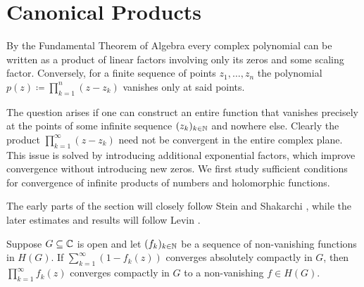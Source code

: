 \section{Canonical Products} \label{sec:canonical-products}

By the Fundamental Theorem of Algebra every complex polynomial can be written as a product of linear factors involving only its zeros and some scaling factor. Conversely, for a finite sequence of points $z_1, \hdots, z_n$ the polynomial $p(z) \coloneqq \prod_{k=1}^n (z - z_k)$ vanishes only at said points.

The question arises if one can construct an entire function that vanishes precisely at the points of some infinite sequence $(z_k)_{k \in \mathbb{N}}$ and nowhere else. Clearly the product $\prod_{k=1}^\infty (z - z_k)$ need not be convergent in the entire complex plane. This issue is solved by introducing additional exponential factors, which improve convergence without introducing new zeros. We first study sufficient conditions for convergence of infinite products of numbers and holomorphic functions.

The early parts of the section will closely follow Stein and Shakarchi \cite{stein-shakarchi-princeton}, while the later estimates and results will follow Levin \cite{levin-distribution-of-zeros}.

\begin{lemma} \label{lem:infinite-product-criteria}
    Suppose $G \subseteq \mathbb{C}$ is open and let $(f_k)_{k \in \mathbb{N}}$ be a sequence of non-vanishing functions in $H(G)$. If $\sum_{k=1}^\infty (1 - f_k(z))$ converges absolutely compactly in $G$, then $\prod_{k=1}^\infty f_k(z)$ converges compactly in $G$ to a non-vanishing $f \in H(G)$.
\end{lemma}
    
